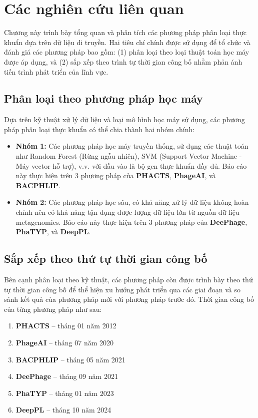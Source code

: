 \chapter{Các nghiên cứu liên quan}

Chương này trình bày tổng quan và phân tích các phương pháp phân loại thực khuẩn dựa trên dữ liệu di truyền. Hai tiêu chí chính được sử dụng để tổ chức và đánh giá các phương pháp bao gồm: (1) phân loại theo loại thuật toán học máy được áp dụng, và (2) sắp xếp theo trình tự thời gian công bố nhằm phản ánh tiến trình phát triển của lĩnh vực.

\section{Phân loại theo phương pháp học máy}

Dựa trên kỹ thuật xử lý dữ liệu và loại mô hình học máy sử dụng, các phương pháp phân loại thực khuẩn có thể chia thành hai nhóm chính:

\begin{itemize}
    \item \textbf{Nhóm 1:} Các phương pháp học máy truyền thống, sử dụng các thuật toán như Random Forest (Rừng ngẫu nhiên), SVM (Support Vector Machine - Máy vector hỗ trợ), v.v. với đầu vào là bộ gen thực khuẩn đầy đủ. Báo cáo này thực hiện trên 3 phương pháp của \textbf{PHACTS}, \textbf{PhageAI}, và \textbf{BACPHLIP}.
    
    \item \textbf{Nhóm 2:} Các phương pháp học sâu, có khả năng xử lý dữ liệu không hoàn chỉnh nên có khả năng tận dụng được lượng dữ liệu lớn từ nguồn dữ liệu metagenomics. Báo cáo này thực hiện trên 3 phương pháp của \textbf{DeePhage}, \textbf{PhaTYP}, và \textbf{DeepPL}.
\end{itemize}

\section{Sắp xếp theo thứ tự thời gian công bố}

Bên cạnh phân loại theo kỹ thuật, các phương pháp còn được trình bày theo thứ tự thời gian công bố để thể hiện xu hướng phát triển qua các giai đoạn và so sánh kết quả của phương pháp mới với phương pháp trước đó. Thời gian công bố của từng phương pháp như sau:

\begin{enumerate}
    \item \textbf{PHACTS} – tháng 01 năm 2012
    \item \textbf{PhageAI} – tháng 07 năm 2020
    \item \textbf{BACPHLIP} – tháng 05 năm 2021
    \item \textbf{DeePhage} – tháng 09 năm 2021
    \item \textbf{PhaTYP} – tháng 01 năm 2023
    \item \textbf{DeepPL} – tháng 10 năm 2024
\end{enumerate}

